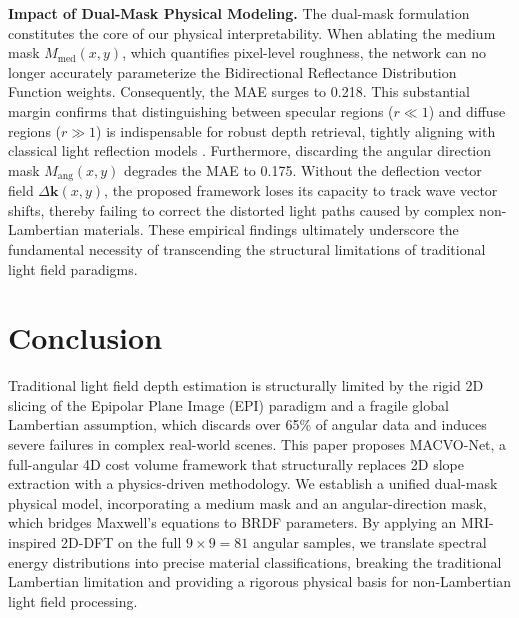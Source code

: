 \documentclass[lettersize,journal]{IEEEtran}
\begin{document}
\textbf{Impact of Dual-Mask Physical Modeling.} The dual-mask formulation constitutes the core of our physical interpretability. When ablating the medium mask $M_{\text{med}}(x,y)$, which quantifies pixel-level roughness, the network can no longer accurately parameterize the Bidirectional Reflectance Distribution Function weights. Consequently, the MAE surges to 0.218. This substantial margin confirms that distinguishing between specular regions ($r \ll 1$) and diffuse regions ($r \gg 1$) is indispensable for robust depth retrieval, tightly aligning with classical light reflection models \cite{blinn1977}. Furthermore, discarding the angular direction mask $M_{\text{ang}}(x,y)$ degrades the MAE to 0.175. Without the deflection vector field $\Delta\mathbf{k}(x,y)$, the proposed framework loses its capacity to track wave vector shifts, thereby failing to correct the distorted light paths caused by complex non-Lambertian materials. These empirical findings ultimately underscore the fundamental necessity of transcending the structural limitations of traditional light field paradigms.

\section{Conclusion}

Traditional light field depth estimation is structurally limited by the rigid 2D slicing of the Epipolar Plane Image (EPI) paradigm and a fragile global Lambertian assumption, which discards over 65\% of angular data and induces severe failures in complex real-world scenes. This paper proposes MACVO-Net, a full-angular 4D cost volume framework that structurally replaces 2D slope extraction with a physics-driven methodology. We establish a unified dual-mask physical model, incorporating a medium mask and an angular-direction mask, which bridges Maxwell's equations to BRDF parameters. By applying an MRI-inspired 2D-DFT on the full $9 \times 9 = 81$ angular samples, we translate spectral energy distributions into precise material classifications, breaking the traditional Lambertian limitation and providing a rigorous physical basis for non-Lambertian light field processing. 
\end{document}
